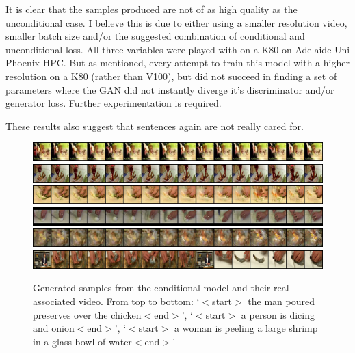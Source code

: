 \documentclass{report}
\theoremstyle{plain}
\theoremstyle{definition}
\theoremstyle{remark}
\numberwithin{equation}{section}
\numberwithin{figure}{section}
\newcommand{\<}{\langle}
\renewcommand{\>}{\rangle}
\begin{document}
It is clear that the samples produced are not of as high quality as the unconditional case. I believe this is due to either using a smaller resolution video, smaller batch size and/or the suggested combination of conditional and unconditional loss. All three variables were played with on a K80 on Adelaide Uni Phoenix HPC. But as mentioned, every attempt to train this model with a higher resolution on a K80 (rather than V100), but did not succeed in finding a set of parameters where the GAN did not instantly diverge it's discriminator and/or generator loss. Further experimentation is required.

These results also suggest that sentences again are not really cared for.

\begin{figure}[H]
    \label{fig:cond_mr}
    \centering
    \caption{Generated samples from the conditional model and their real associated video. From top to bottom: `$<$start$>$ the man poured preserves over the chicken$<$end$>$', `$<$start$>$ a person is dicing and onion$<$end$>$', `$<$start$>$ a woman is peeling a large shrimp in a glass bowl of water$<$end$>$'}
    \includegraphics[width=0.95\linewidth]{images/cond_mr/1.jpg}\\
    \includegraphics[width=0.95\linewidth]{images/cond_mr/1.png}\\
    \includegraphics[width=0.95\linewidth]{images/cond_mr/2.jpg}\\
    \includegraphics[width=0.95\linewidth]{images/cond_mr/2.png}\\
    \includegraphics[width=0.95\linewidth]{images/cond_mr/3.jpg}\\
    \includegraphics[width=0.95\linewidth]{images/cond_mr/3.png}\\
\end{figure}
\end{document}

